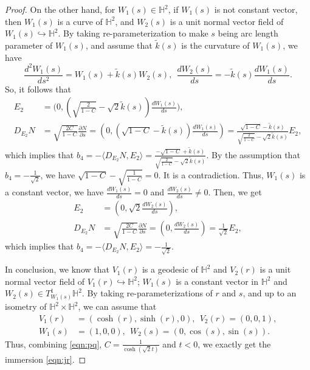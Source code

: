 \documentclass[reqno]{amsart}%
\theoremstyle{definition}
\numberwithin{equation}{section}
\begin{document}
\begin{proof}
On the other hand, for $W_1(s)\in \mathbb{H}^2$, if $W_1(s)$ is not constant vector,
then $W_1(s)$ is a curve of $\mathbb{H}^2$,
and $W_2(s)$ is a unit normal vector field of $W_1(s)\hookrightarrow\mathbb{H}^2$.
By taking re-parameterization to make $s$ being arc length parameter of $W_1(s)$, and assume that
$\tilde{k}(s)$ is the curvature of $W_1(s)$, we have
$$
\frac{d^2W_1(s)}{ds^2}=W_1(s)+\tilde{k}(s)W_2(s), \ \
\frac{dW_2(s)}{ds}=-\tilde{k}(s)\frac{dW_1(s)}{ds}.
$$
So, it follows that
$$
\begin{aligned}
E_2&=\Big(0,(\sqrt{\tfrac{2}{1-C}}-\sqrt{2}\tilde{k}(s))\tfrac{d W_1(s)}{ds}\Big),\\
D_{E_2}N&=\sqrt{\tfrac{2C}{1-C}}\tfrac{\partial N}{\partial s}=
(0,(\sqrt{1-C}-\tilde{k}(s))\tfrac{d W_1(s)}{d s})=\tfrac{\sqrt{1-C}-\tilde{k}(s)}{\sqrt{\tfrac{2}{1-C}}-\sqrt{2}\tilde{k}(s)}E_2,
\end{aligned}
$$
which implies that $b_4=-\langle D_{E_2}N,E_2\rangle=\frac{-\sqrt{1-C}+\tilde{k}(s)}{\sqrt{\frac{2}{1-C}}-\sqrt{2}\tilde{k}(s)}$.
By the assumption that $b_4=-\frac{1}{\sqrt{2}}$, we have $\sqrt{1-C}-\sqrt{\frac{1}{1-C}}=0$.
It is a contradiction. Thus, $W_1(s)$ is a constant vector, we have
$\frac{d W_1(s)}{ds}=0$ and $\frac{d W_2(s)}{ds}\neq0$.
Then, we get
$$
\begin{aligned}
E_2&=(0,\sqrt{2}\tfrac{d W_2(s)}{d s}),\\
D_{E_2}N&=\sqrt{\tfrac{2C}{1-C}}\tfrac{\partial N}{\partial s}=
(0,\tfrac{d W_2(s)}{d s})=\tfrac{1}{\sqrt{2}}E_2,
\end{aligned}
$$
which implies that $b_4=-\langle D_{E_2}N,E_2\rangle=-\frac{1}{\sqrt{2}}$.

In conclusion, we know that $V_1(r)$ is a geodesic of $\mathbb{H}^2$ and $V_2(r)$ is a unit normal
vector field of $V_1(r)\hookrightarrow\mathbb{H}^2$;
$W_1(s)$ is a constant vector in $\mathbb{H}^2$ and $W_2(s)\in T^1_{W_1(s)}\mathbb{H}^2$.
By taking re-parameterizations of $r$ and $s$, and up to an isometry of $\mathbb{H}^2\times \mathbb{H}^2$, we can assume that
$$
\begin{aligned}
V_1(r)&=(\cosh(r),\sinh(r),0),\ \ V_2(r)=(0,0,1),\\
W_1(s)&=(1,0,0), \ \ W_2(s)=(0,\cos(s),\sin(s)).
\end{aligned}
$$
Thus, combining \eqref{eqn:pq}, $C=\frac{1}{\cosh(\sqrt{2}t)}$ and $t<0$, we exactly get the immersion \eqref{eqn:jr}.
\end{proof}
\end{document}
